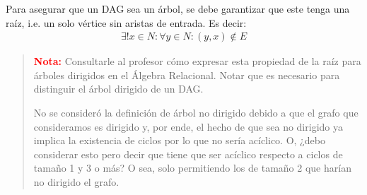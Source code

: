 \documentclass{article}
\begin{document}
Para asegurar que un DAG sea un árbol, se debe garantizar que este tenga una raíz, i.e. un solo vértice sin aristas de entrada.
Es decir:
\begin{equation*}
  \begin{aligned}
    \exists! x \in N : \forall y \in N : (y, x) \notin E
  \end{aligned}
\end{equation*}

\begin{quotation}
  \textcolor{red}{\textbf{Nota:}} Consultarle al profesor cómo expresar esta propiedad de la raíz para árboles dirigidos en el Álgebra Relacional.
  Notar que es necesario para distinguir el árbol dirigido de un DAG.

  No se consideró la definición de árbol no dirigido debido a que el grafo que consideramos es dirigido y, por ende, el hecho de que sea no dirigido ya implica la existencia de ciclos por lo que no sería acíclico.
  O, ¿debo considerar esto pero decir que tiene que ser acíclico respecto a ciclos de tamaño 1 y 3 o más? O sea, solo permitiendo los de tamaño 2 que harían no dirigido el grafo.
\end{quotation}
\end{document}
